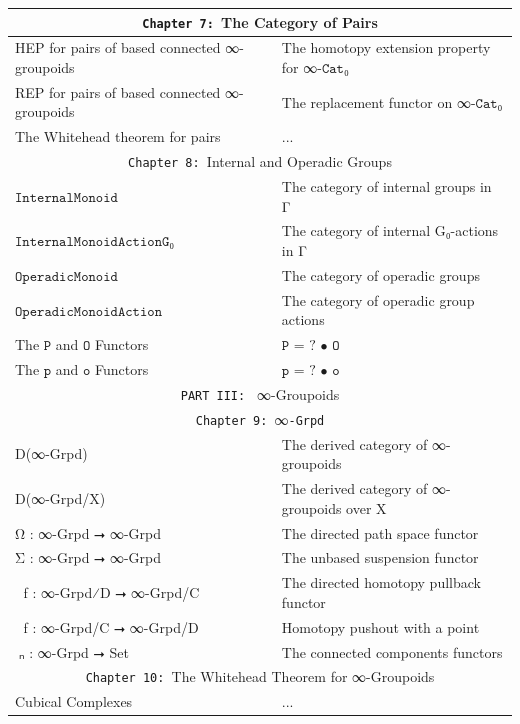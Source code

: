 \documentclass{book}
\theoremstyle{definition}
\begin{document}
{\begin{longtable}{|| l || l ||}
\hline \hline
  \multicolumn{2}{||c||}{\texttt{Chapter 7: }The Category of Pairs} \\
\hline \hline
HEP for pairs of based connected ∞-groupoids & The homotopy extension property for ∞$\texttt{-Cat}$₀\\
 \hline
REP for pairs of based connected ∞-groupoids & The replacement functor on ∞$\texttt{-Cat}$₀ \\
\hline 
The Whitehead theorem for pairs & ... \\
\hline \hline
 \multicolumn{2}{||c||}{\texttt{Chapter 8: }Internal and Operadic Groups} \\
\hline \hline
 $\texttt{InternalMonoid}$   & The category of internal groups in Γ  \\
 \hline
 $\texttt{InternalMonoidActionG₀}$ & The category of internal G₀-actions in Γ   \\
 \hline
  $\texttt{OperadicMonoid}$  & The category of operadic groups  \\
 \hline
 $\texttt{OperadicMonoidAction}$  & The category of operadic group actions  \\
 \hline
  The $\texttt{P}$ and $\texttt{O}$ Functors & $\texttt{P = ? • O}$ \\
 \hline
 The $\texttt{p}$ and $\texttt{o}$ Functors & $\texttt{p = ? • o}$ \\
 \hline
\hline \hline
\multicolumn{2}{||c||}{\texttt{PART III: } ∞-Groupoids} \\
\hline \hline 
\multicolumn{2}{||c||}{\texttt{Chapter 9: }∞\texttt{-Grpd}}\\
\hline \hline
D(∞-Grpd) & The derived category of ∞-groupoids \\
\hline
D(∞-Grpd/X) & The derived category of ∞-groupoids over X \\
\hline
Ω⃡ : ∞-Grpd ⭢ ∞-Grpd & The directed path space functor \\
 \hline 
Σ⃡ : ∞-Grpd ⭢ ∞-Grpd & The unbased suspension functor \\
 \hline 
ω⃡ f : ∞-Grpd⁄D ⭢ ∞-Grpd/C & The directed homotopy pullback functor\\
\hline 
σ⃡ f : ∞-Grpd/C ⭢ ∞-Grpd/D & Homotopy pushout with a point \\
 \hline 
π⃡ₙ : ∞-Grpd ⭢ Set & The connected components functors\\
 \hline \hline
 \multicolumn{2}{||c||}{\texttt{Chapter 10: }The Whitehead Theorem for ∞-Groupoids} \\
\hline \hline
Cubical Complexes & ...\\
\hline

\end{longtable}}
\end{document}
